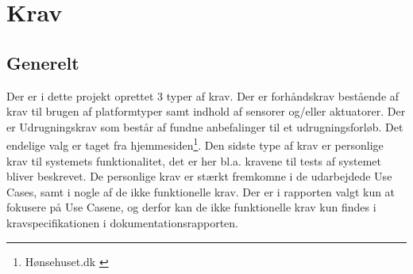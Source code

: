 \chapter{Krav}

\section{Generelt}
Der er i dette projekt oprettet 3 typer af krav. Der er forhåndskrav bestående af krav til brugen af platformtyper samt indhold af sensorer og/eller aktuatorer. Der er Udrugningskrav som består af fundne anbefalinger til et udrugningsforløb. Det endelige valg er taget fra hjemmesiden\footnote{Hønsehuset.dk \cite{Rugetips}}. Den sidste type af krav er personlige krav til systemets funktionalitet, det er her bl.a. kravene til tests af systemet bliver beskrevet. De personlige krav er stærkt fremkomne i de udarbejdede Use Cases, samt i nogle af de ikke funktionelle krav. Der er i rapporten valgt kun at fokusere på Use Casene, og derfor kan de ikke funktionelle krav kun findes i kravspecifikationen i dokumentationsrapporten.

